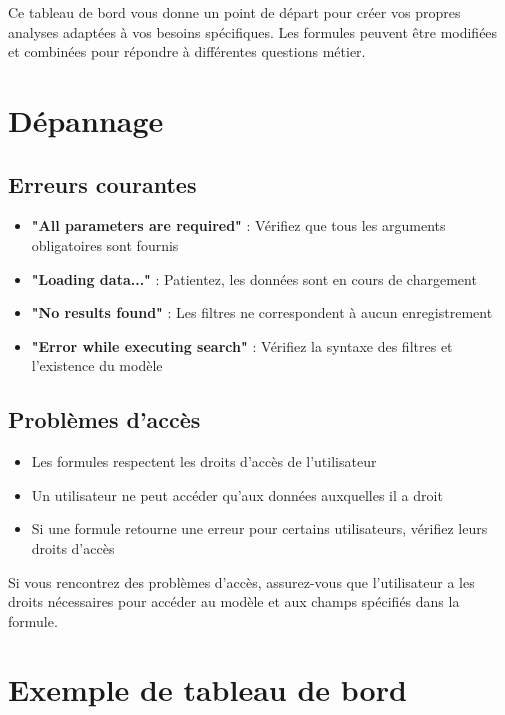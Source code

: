 \documentclass[12pt, a4paper]{article}
\begin{document}
Ce tableau de bord vous donne un point de départ pour créer vos propres analyses adaptées à vos besoins spécifiques. Les formules peuvent être modifiées et combinées pour répondre à différentes questions métier.

\section{Dépannage}

\subsection{Erreurs courantes}
\begin{itemize}
    \item \textbf{"All parameters are required"} : Vérifiez que tous les arguments obligatoires sont fournis
    \item \textbf{"Loading data..."} : Patientez, les données sont en cours de chargement
    \item \textbf{"No results found"} : Les filtres ne correspondent à aucun enregistrement
    \item \textbf{"Error while executing search"} : Vérifiez la syntaxe des filtres et l'existence du modèle
\end{itemize}

\subsection{Problèmes d'accès}
\begin{itemize}
    \item Les formules respectent les droits d'accès de l'utilisateur
    \item Un utilisateur ne peut accéder qu'aux données auxquelles il a droit
    \item Si une formule retourne une erreur pour certains utilisateurs, vérifiez leurs droits d'accès
\end{itemize}

\begin{warning}
Si vous rencontrez des problèmes d'accès, assurez-vous que l'utilisateur a les droits nécessaires pour accéder au modèle et aux champs spécifiés dans la formule.
\end{warning}

\section{Exemple de tableau de bord}
\end{document}
